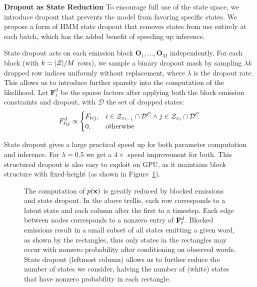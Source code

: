 \documentclass[11pt,a4paper]{article}
\begin{document}
\noindent
\textbf{Dropout as State Reduction}
To encourage full use of the state space,
we introduce dropout that prevents the model from favoring specific states. 
We propose a form of HMM state dropout that removes states from use entirely
at each batch,
which has the added benefit of speeding up inference.

State dropout acts on each emission block $\mathbf{O}_1, \ldots, \mathbf{O}_M$ independently.
For each block (with $k=|{\cal Z}| / M$ rows), we sample a binary dropout mask by sampling
$ \lambda k$ dropped row indices uniformly without replacement,
where $\lambda$ is the dropout rate.
This allows us to introduce further sparsity into the computation of the likelihood.
Let $\mathbf{F}_t^d$ be the sparse factors after applying both the block emission constraints
and dropout, with $\mathcal{D}$ the set of dropped states:
\begin{equation}
\label{eqn:dropout_factors}
F_{tij}^d \propto \begin{cases}
F_{tij}, & i\in\mathcal{Z}_{x_{t-1}}\cap \mathcal{D}^C \wedge j\in\mathcal{Z}_{x_t} \cap\mathcal{D}^C\\
0, & \textrm{otherwise}
\end{cases}
\end{equation}

State dropout gives a large practical speed up for both parameter computation and inference.
For $\lambda=0.5$ we get a $4\times$ speed improvement for both.
This structured dropout is also easy to exploit on GPU,
as it maintains block structure with fixed-height (as shown in Figure~\ref{fig:trellis}).

\begin{figure}[!t]
\begin{center}

\end{center}
\caption{
\label{fig:trellis}
The computation of $p(\mathbf{x})$ is greatly reduced by blocked emissions and state dropout.
In the above trellis, each row corresponds to a latent state and each column after 
the first to a timestep.
Each edge between nodes corresponds to a nonzero entry of $\mathbf{F}_t^d$.
Blocked emissions result in a small subset of all states emitting a given word,
as shown by the rectangles, thus only states in the rectangles may occur
with nonzero probability after conditioning on observed words.
State dropout (leftmost column) allows us to further reduce the number of states we consider,
halving the number of (white) states that have nonzero probability in each rectangle.
}
\end{figure}
\end{document}
